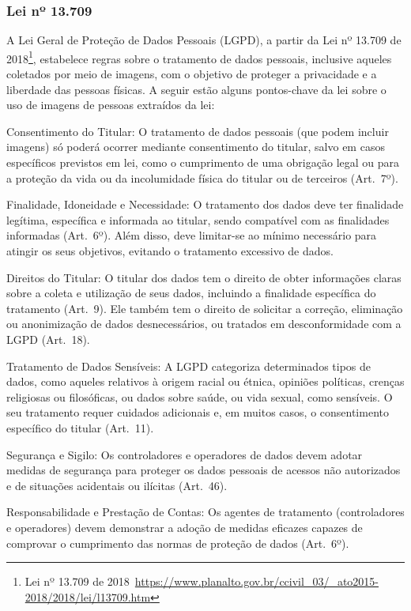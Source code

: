\subsubsection{Lei nº 13.709}
A Lei Geral de Proteção de Dados Pessoais (LGPD), a partir da Lei nº 13.709 de 2018\footnote{Lei nº 13.709 de 2018~\url{https://www.planalto.gov.br/ccivil_03/_ato2015-2018/2018/lei/l13709.htm}}, estabelece regras sobre o tratamento de dados pessoais, inclusive aqueles coletados por meio de imagens, com o objetivo de proteger a privacidade e a liberdade das pessoas físicas.
A seguir estão alguns pontos-chave da lei sobre o uso de imagens de pessoas extraídos da lei:

Consentimento do Titular: O tratamento de dados pessoais (que podem incluir imagens) só poderá ocorrer mediante consentimento do titular, salvo em casos específicos previstos em lei, como o cumprimento de uma obrigação legal ou para a proteção da vida ou da incolumidade física do titular ou de terceiros (Art.\ 7º).

Finalidade, Idoneidade e Necessidade: O tratamento dos dados deve ter finalidade legítima, específica e informada ao titular, sendo compatível com as finalidades informadas (Art.\ 6º).
Além disso, deve limitar-se ao mínimo necessário para atingir os seus objetivos, evitando o tratamento excessivo de dados.

Direitos do Titular: O titular dos dados tem o direito de obter informações claras sobre a coleta e utilização de seus dados, incluindo a finalidade específica do tratamento (Art.\ 9).
Ele também tem o direito de solicitar a correção, eliminação ou anonimização de dados desnecessários, ou tratados em desconformidade com a LGPD (Art.\ 18).

Tratamento de Dados Sensíveis: A LGPD categoriza determinados tipos de dados, como aqueles relativos à origem racial ou étnica, opiniões políticas, crenças religiosas ou filosóficas, ou dados sobre saúde, ou vida sexual, como sensíveis.
O seu tratamento requer cuidados adicionais e, em muitos casos, o consentimento específico do titular (Art.\ 11).

Segurança e Sigilo: Os controladores e operadores de dados devem adotar medidas de segurança para proteger os dados pessoais de acessos não autorizados e de situações acidentais ou ilícitas (Art.\ 46).

Responsabilidade e Prestação de Contas: Os agentes de tratamento (controladores e operadores) devem demonstrar a adoção de medidas eficazes capazes de comprovar o cumprimento das normas de proteção de dados (Art.\ 6º).

